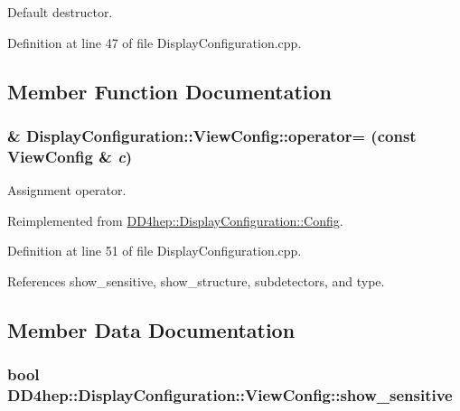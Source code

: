 Default destructor. 

Definition at line 47 of file DisplayConfiguration.cpp.

\subsection{Member Function Documentation}
\hypertarget{class_d_d4hep_1_1_display_configuration_1_1_view_config_ad1dfdd8cd31d55cb2d6aac98d9ec0268}{
\subsubsection[{operator=}]{ \& DisplayConfiguration::ViewConfig::operator= (const {\bf ViewConfig} \& {\em c})}}
\label{class_d_d4hep_1_1_display_configuration_1_1_view_config_ad1dfdd8cd31d55cb2d6aac98d9ec0268}


Assignment operator. 

Reimplemented from \hyperlink{class_d_d4hep_1_1_display_configuration_1_1_config_a4fd5de82887e43ea1a99204c73e13c47}{DD4hep::DisplayConfiguration::Config}.

Definition at line 51 of file DisplayConfiguration.cpp.

References show\_\-sensitive, show\_\-structure, subdetectors, and type.

\subsection{Member Data Documentation}
\hypertarget{class_d_d4hep_1_1_display_configuration_1_1_view_config_a94ea694c9eaca56a34957275f0602f8f}{
\subsubsection[{show\_\-sensitive}]{\setlength{\rightskip}{0pt plus 5cm}bool {\bf DD4hep::DisplayConfiguration::ViewConfig::show\_\-sensitive}}}
\label{class_d_d4hep_1_1_display_configuration_1_1_view_config_a94ea694c9eaca56a34957275f0602f8f}


